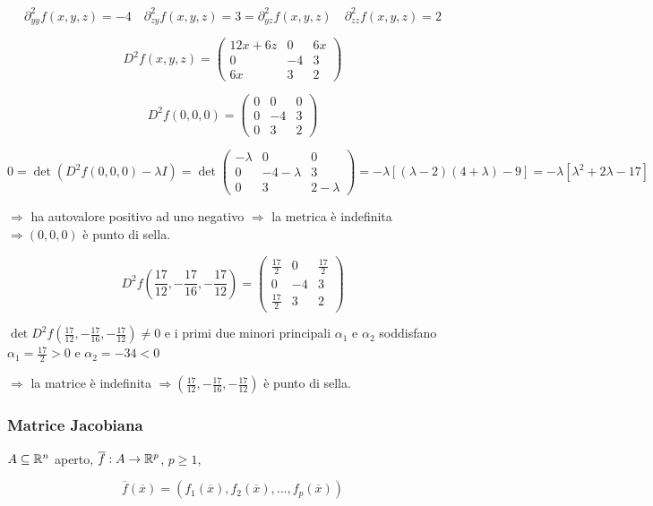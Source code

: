 \begin{exbar}
\begin{example}
	$$\partial_{yy}^2f(x,y,z)=-4 \quad \partial_{zy}^2f(x,y,z)=3=\partial_{yz}^2f(x,y,z) \quad \partial_{zz}^2f(x,y,z)=2$$
	
	$$D^2f(x,y,z)=\begin{pmatrix}
		12x+6z&0&6x\\
		0&-4&3\\
		6x&3&2
	\end{pmatrix}$$
	
	$$D^2f(0,0,0)=\begin{pmatrix}
		0&0&0\\
		0&-4&3\\
		0&3&2
	\end{pmatrix}$$
	
	$$0=\det(D^2f(0,0,0)-\lambda I)= \det \begin{pmatrix}
		-\lambda&0&0\\
		0&-4-\lambda&3\\
		0&3&2-\lambda
	\end{pmatrix}=-\lambda[(\lambda-2)(4+\lambda)-9]=-\lambda[\lambda^2+2\lambda-17]$$
	
	$ \Rightarrow$ ha autovalore positivo ad uno negativo $\Rightarrow$ la metrica è indefinita $\Rightarrow (0,0,0)$ è punto di sella.
	
	$$D^2f(\frac{17}{12},-\frac{17}{16},-\frac{17}{12})=\begin{pmatrix}
		\frac{17}{2}&0&\frac{17}{2}\\
		0&-4&3\\
		\frac{17}{2}&3&2
	\end{pmatrix}$$
	
	$\det D^2f(\frac{17}{12},-\frac{17}{16},-\frac{17}{12})\neq 0$ e i primi due minori principali $\alpha_1$ e $\alpha_2$ soddisfano $\alpha_1= \frac{17}{2} >0$ e $\alpha_2 =-34 <0$
	
	$\Rightarrow$ la matrice è indefinita $\Rightarrow (\frac{17}{12},-\frac{17}{16},-\frac{17}{12})$ è punto di sella.
\end{example}
\end{exbar}


\subsubsection{Matrice Jacobiana}

$A \subseteq \mathbb{R}^n$ aperto, $\overline{f}: A \rightarrow \mathbb{R}^p$, $p \geq 1$, 

$$\overline{f}(\overline{x})=(f_1(\overline{x}),f_2(\overline{x}),...,f_p(\overline{x}))$$


